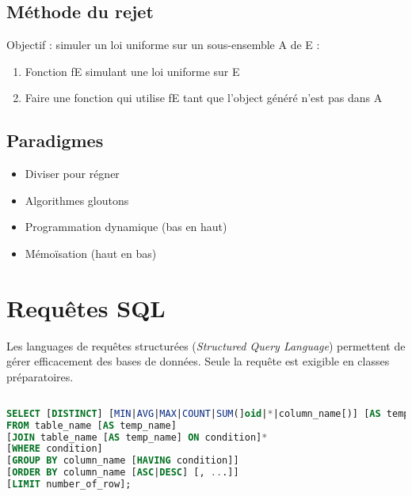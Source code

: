 \documentclass{hibiscus}
\begin{document}
\subsection{Méthode du rejet}

\par Objectif : simuler un loi uniforme sur un sous-ensemble A de E :

\begin{enumerate}
\item Fonction fE simulant une loi uniforme sur E
\item Faire une fonction qui utilise fE tant que l'object généré n'est pas dans A
\end{enumerate}

\subsection{Paradigmes}

\begin{itemize}
\item Diviser pour régner
\item Algorithmes gloutons
\item Programmation dynamique (bas en haut)
\item Mémoïsation (haut en bas)
\end{itemize}


\newpage \section{Requêtes SQL}


\par Les languages de requêtes structurées (\textit{Structured Query Language}) permettent de gérer efficacement des bases de données. Seule la requête  est exigible en classes préparatoires.

\subsection{}

\begin{lstlisting}[language=SQL]
SELECT [DISTINCT] [MIN|AVG|MAX|COUNT|SUM(]oid|*|column_name[)] [AS temp_name] [, ...]
FROM table_name [AS temp_name]
[JOIN table_name [AS temp_name] ON condition]*
[WHERE condition]
[GROUP BY column_name [HAVING condition]]
[ORDER BY column_name [ASC|DESC] [, ...]]
[LIMIT number_of_row];
\end{lstlisting}
\end{document}
